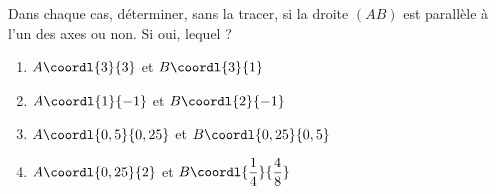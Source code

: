 \begin{exo}{}
	Dans chaque cas, déterminer, sans la tracer, si la droite $(AB)$ est parallèle à l'un des axes ou non. Si oui, lequel ?
	\begin{enumerate}
		\item $A\coordl{3}{3}$ et $B\coordl{3}{1}$
		\item $A\coordl{1}{-1}$ et $B\coordl{2}{-1}$
		\item $A\coordl{0,5}{0,25}$ et $B\coordl{0,25}{0,5}$
		\item $A\coordl{0,25}{2}$ et $B\coordl{\dfrac{1}{4}}{\dfrac{4}{8}}$
	\end{enumerate}
\end{exo}

